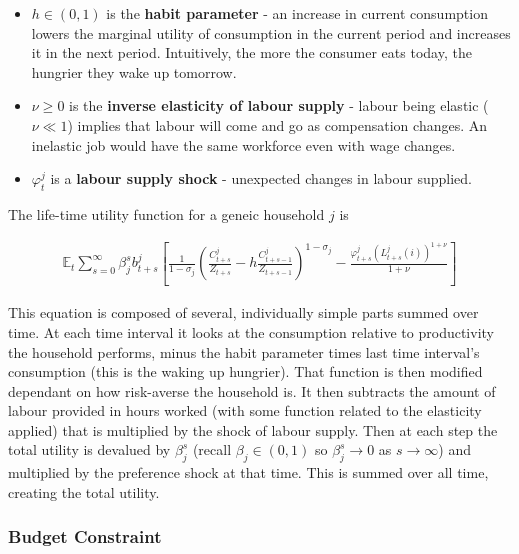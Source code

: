 \documentclass[notitlepage,12pt]{report}
\begin{document}
\begin{appendices}
\begin{itemize}
		\item \(h\in(0,1)\) is the {\bf habit parameter} - an increase in current consumption lowers the marginal utility of consumption in the current period and increases it in the next period. Intuitively, the more the consumer eats today, the hungrier they wake up tomorrow.
		\item \(\nu\geq0\) is the {\bf inverse elasticity of labour supply} - labour being elastic (\(\nu\ll1\)) implies that labour will come and go as compensation changes. An inelastic job would have the same workforce even with wage changes.
		\item \(\varphi_t^j\) is a {\bf labour supply shock} - unexpected changes in labour supplied.
	\end{itemize}
	
	The life-time utility function for a geneic household \(j\) is
	
	\begin{align}
	\mathbb{E}_t\sum_{s=0}^\infty\beta_j^s b_{t+s}^j \left[ \frac{1}{1-\sigma_j} \left( \frac{C_{t+s}^j}{Z_{t+s}}-h\frac{C_{t+s-1}^j}{Z_{t+s-1}} \right)^{1-\sigma_j} - \frac{\varphi_{t+s}^j(L_{t+s}^j(i))^{1+\nu}}{1+\nu} \right]
	\end{align}
	
	This equation is composed of several, individually simple parts summed over time. At each time interval it looks at the consumption relative to productivity the household performs, minus the habit parameter times last time interval's consumption (this is the waking up hungrier). That function is then modified dependant on how risk-averse the household is. It then subtracts the amount of labour provided in hours worked (with some function related to the elasticity applied) that is multiplied by the shock of labour supply.
	Then at each step the total utility is devalued by \(\beta_j^s\) (recall \(\beta_j\in(0,1)\) so \(\beta_j^s\to0\) as \(s\to\infty\)) and multiplied by the preference shock at that time.
	This is summed over all time, creating the total utility.
	
	\subsubsection{Budget Constraint}
	

\end{appendices}
\end{document}
